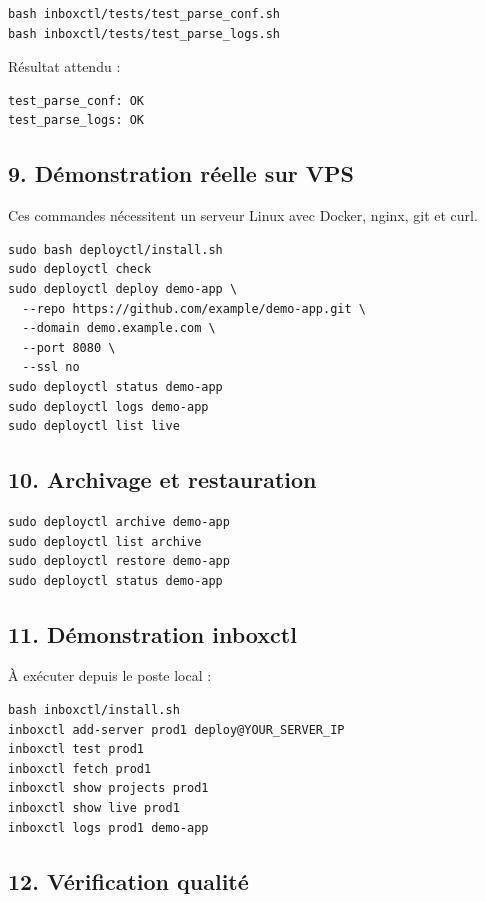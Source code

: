 \documentclass[12pt,a4paper]{article}
\begin{document}
\begin{lstlisting}
bash inboxctl/tests/test_parse_conf.sh
bash inboxctl/tests/test_parse_logs.sh
\end{lstlisting}

Résultat attendu :

\begin{lstlisting}
test_parse_conf: OK
test_parse_logs: OK
\end{lstlisting}

\subsection{9. Démonstration réelle sur VPS}

Ces commandes nécessitent un serveur Linux avec Docker, nginx, git et curl.

\begin{lstlisting}
sudo bash deployctl/install.sh
sudo deployctl check
sudo deployctl deploy demo-app \
  --repo https://github.com/example/demo-app.git \
  --domain demo.example.com \
  --port 8080 \
  --ssl no
sudo deployctl status demo-app
sudo deployctl logs demo-app
sudo deployctl list live
\end{lstlisting}

\subsection{10. Archivage et restauration}

\begin{lstlisting}
sudo deployctl archive demo-app
sudo deployctl list archive
sudo deployctl restore demo-app
sudo deployctl status demo-app
\end{lstlisting}

\subsection{11. Démonstration inboxctl}

À exécuter depuis le poste local :

\begin{lstlisting}
bash inboxctl/install.sh
inboxctl add-server prod1 deploy@YOUR_SERVER_IP
inboxctl test prod1
inboxctl fetch prod1
inboxctl show projects prod1
inboxctl show live prod1
inboxctl logs prod1 demo-app
\end{lstlisting}

\subsection{12. Vérification qualité}
\end{document}
